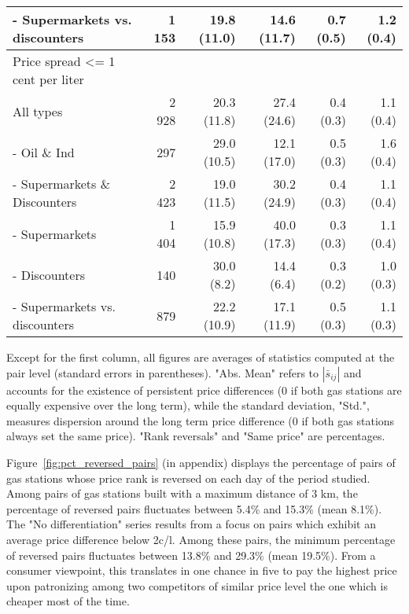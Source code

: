\documentclass[english]{article}
\begin{document}
\begin{table}
\begin{threeparttable}
\begin{tabular}{lrrrrr}
    \hspace*{4mm} - Supermarkets vs. discounters & 1 153 & 19.8 (11.0) & 14.6 (11.7) & 0.7 (0.5) & 1.2 (0.4) \\
    \midrule
    Price spread <= 1 cent per liter &       &       &       &       &  \\
    All types & 2 928 & 20.3 (11.8) & 27.4 (24.6) & 0.4 (0.3) & 1.1 (0.4) \\
    - Oil \& Ind & 297   & 29.0 (10.5) & 12.1 (17.0) & 0.5 (0.3) & 1.6 (0.4) \\
    - Supermarkets \& Discounters & 2 423 & 19.0 (11.5) & 30.2 (24.9) & 0.4 (0.3) & 1.1 (0.4) \\
    \hspace*{4mm} - Supermarkets & 1 404 & 15.9 (10.8) & 40.0 (17.3) & 0.3 (0.3) & 1.1 (0.4) \\
    \hspace*{4mm} - Discounters & 140   & 30.0 \phantom{0}(8.2) & 14.4 \phantom{0}(6.4) & 0.3 (0.2) & 1.0 (0.3) \\
    \hspace*{4mm} - Supermarkets vs. discounters & 879   & 22.2 (10.9) & 17.1 (11.9) & 0.5 (0.3) & 1.1 (0.3) \\
    \bottomrule
    \bottomrule
\end{tabular}
\begin{tablenotes}
			\small
      \item Except for the first column, all figures are averages of statistics computed at the pair level (standard errors in parentheses). "Abs. Mean" refers to $|\bar{s}_{ij}|$ and accounts for the existence of persistent price differences (0 if both gas stations are equally expensive over the long term), while the standard deviation, "Std.", measures dispersion around the long term price difference (0 if both gas stations always set the same price). "Rank reversals" and "Same price" are percentages.
\end{tablenotes}
\end{threeparttable}
\end{table}

Figure~\ref{fig:pct_reversed_pairs} (in appendix) displays the percentage of pairs of gas stations whose price rank is reversed on each day of the period studied. Among pairs of gas stations built with a maximum distance of 3 km, the percentage of reversed pairs fluctuates between 5.4\% and 15.3\%  (mean 8.1\%). The "No differentiation" series results from a focus on pairs which exhibit an average price difference below 2c/l. Among these pairs, the minimum percentage of reversed pairs fluctuates between 13.8\% and 29.3\% (mean 19.5\%). From a consumer viewpoint, this translates in one chance in five to pay the highest price upon patronizing among two competitors of similar price level the one which is cheaper most of the time.
\end{document}
